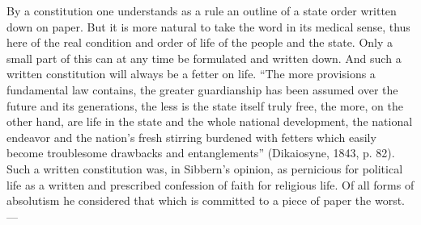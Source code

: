 \documentclass[12pt,a4paper,openany]{book}
\newcommand{\opage}[1]{\marginnote{\footnotesize\textit{[#1]}}}
\begin{document}
By a constitution one understands as a rule an outline of
a state order written down on paper. But it is more natural
to take the word in its medical sense, thus here
of the real condition and order of life of the people and the state. Only
a small part of this can at any time be formulated
and written down. And such a written constitution will always
be a fetter on life. ``The more provisions a
fundamental law contains, the greater guardianship has been assumed
over the future and its generations, the less is the state itself
truly free, the more, on the other hand, are life in the state
and the whole national development, the national endeavor and the nation's
fresh stirring burdened with fetters which easily become
troublesome drawbacks and entanglements'' (Dikaiosyne, 1843, p. 82).
Such a written constitution was, in Sibbern's opinion,
as pernicious for political life as a written and
\opage{101}prescribed confession of faith for religious life. Of all
forms of absolutism he considered that which is committed to
a piece of paper the worst. ---
\end{document}
